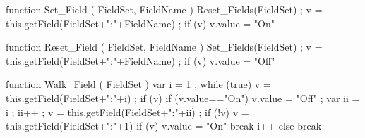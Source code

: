 function Set_Field ( FieldSet, FieldName ) 
  { Reset_Fields(FieldSet) ; 
    v = this.getField(FieldSet+":"+FieldName) ; 
    if (v) { v.value = "On" } }

function Reset_Field ( FieldSet, FieldName ) 
  { Set_Fields(FieldSet) ; 
    v = this.getField(FieldSet+":"+FieldName) ; 
    if (v) { v.value = "Off" } }

function Walk_Field ( FieldSet ) 
  { var i = 1 ; 
    while (true) 
      { v = this.getField(FieldSet+":"+i) ; 
        if (v) 
          { if (v.value=="On") 
              { v.value = "Off" ; 
                var ii = i ; ii++ ; 
                v = this.getField(FieldSet+":"+ii) ; 
                if (!v) 
                  { v = this.getField(FieldSet+":"+1) }
                if (v) 
                  { v.value = "On" }
                break }
            i++ } 
        else
          { break } } }

\stopJSpreamble

\endinput
